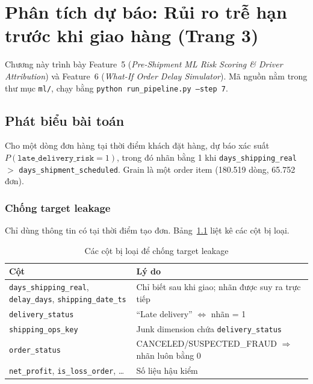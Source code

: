 \chapter{Phân tích dự báo: Rủi ro trễ hạn trước khi giao hàng (Trang 3)}
\label{chap:predictive}

Chương này trình bày Feature~5 (\textit{Pre-Shipment ML Risk Scoring \& Driver Attribution})
và Feature~6 (\textit{What-If Order Delay Simulator}). Mã nguồn nằm trong thư mục \texttt{ml/},
chạy bằng \texttt{python run\_pipeline.py --step 7}.

\section{Phát biểu bài toán}
Cho một dòng đơn hàng tại thời điểm khách đặt hàng, dự báo xác suất
$P(\texttt{late\_delivery\_risk}=1)$, trong đó nhãn bằng 1 khi
\texttt{days\_shipping\_real} $>$ \texttt{days\_shipment\_scheduled}.
Grain là một order item (180.519 dòng, 65.752 đơn).

\subsection{Chống target leakage}
Chỉ dùng thông tin có tại thời điểm tạo đơn. Bảng~\ref{tab:leak-cols} liệt kê các cột bị loại.

\begin{table}[H]
\centering
\caption{Các cột bị loại để chống target leakage}
\label{tab:leak-cols}
\begin{tabularx}{\linewidth}{lX}
\toprule
\textbf{Cột} & \textbf{Lý do} \\ \midrule
\texttt{days\_shipping\_real}, \texttt{delay\_days}, \texttt{shipping\_date\_ts} & Chỉ biết sau khi giao; nhãn được suy ra trực tiếp \\
\texttt{delivery\_status} & ``Late delivery'' $\Leftrightarrow$ nhãn = 1 \\
\texttt{shipping\_ops\_key} & Junk dimension chứa \texttt{delivery\_status} \\
\texttt{order\_status} & CANCELED/SUSPECTED\_FRAUD $\Rightarrow$ nhãn luôn bằng 0 \\
\texttt{net\_profit}, \texttt{is\_loss\_order}, \ldots & Số liệu hậu kiểm \\
\bottomrule
\end{tabularx}
\end{table}

